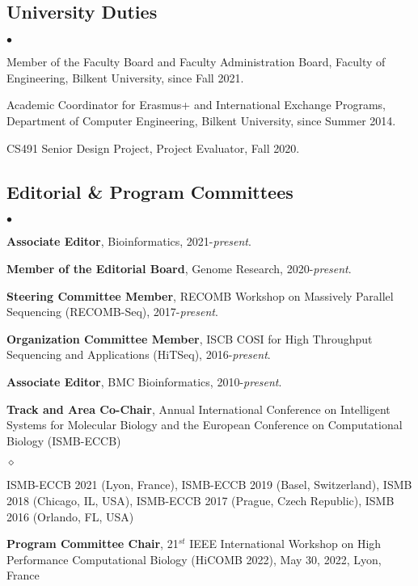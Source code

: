 \documentclass[margin,line]{res}
\newenvironment{list2}{
  \begin{list}{$\bullet$}{%
      \setlength{\itemsep}{0.1cm}
      \setlength{\parsep}{0in} \setlength{\parskip}{0in}
      \setlength{\topsep}{0in} \setlength{\partopsep}{0in} 
      \setlength{\leftmargin}{0.2in}}}{\end{list}}
\newenvironment{list3}{
  \begin{list}{$\diamond$}{%
      \setlength{\itemsep}{0in}
      \setlength{\parsep}{0.1cm} \setlength{\parskip}{0.1cm}
      \setlength{\topsep}{0.1cm} \setlength{\partopsep}{0.1cm} 
      \setlength{\leftmargin}{0.2in}}}{\end{list}}
\begin{document}
\begin{resume}
\subsection{\small \sc University Duties}
\begin{list2}
\item 
 Member of the Faculty Board and Faculty Administration Board, Faculty of Engineering, Bilkent University, since Fall 2021.
\item
  Academic Coordinator for Erasmus+ and International Exchange Programs, Department of Computer Engineering, Bilkent University, since Summer 2014.
  \item CS491 Senior Design Project, Project Evaluator, Fall 2020.
\end{list2}
\vspace{-0.4cm}


\subsection{\small \sc Editorial \& Program Committees}
\begin{list2}
\item
    \textbf{Associate Editor}, Bioinformatics, 2021-\textit{present}.
\item
    \textbf{Member of the Editorial Board}, Genome Research, 2020-\textit{present}.
\item
  \textbf{Steering Committee Member}, RECOMB Workshop on Massively Parallel Sequencing (RECOMB-Seq), 2017-{\it present}.
\item
  \textbf{Organization Committee Member}, ISCB COSI for High Throughput Sequencing and Applications (HiTSeq),
  2016-{\it present}.
\item
  \textbf{Associate Editor}, BMC Bioinformatics, 2010-{\it present}.
\clearpage

\item
  \textbf{Track and Area Co-Chair}, Annual International Conference on Intelligent Systems for Molecular Biology and the European Conference on 
  Computational Biology (ISMB-ECCB)
  \begin{list3}
    \item ISMB-ECCB 2021 (Lyon, France), ISMB-ECCB 2019 (Basel, Switzerland), ISMB 2018 (Chicago, IL, USA), ISMB-ECCB 2017 (Prague, Czech Republic), ISMB 2016 (Orlando, FL, USA)
  \end{list3}

\item 
\textbf{Program Committee Chair}, 21$^{st}$ IEEE International Workshop on High Performance Computational Biology (HiCOMB 2022), May 30, 2022, Lyon, France


\end{list2}
\end{resume}
\end{document}
